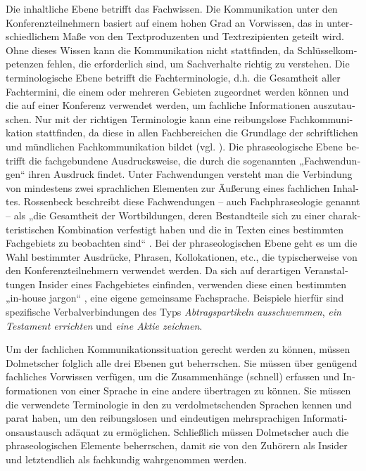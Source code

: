 \documentclass[output=paper]{LSP/langsci}
\begin{document}
\begin{otherlanguage}{ngerman}
Die inhaltliche Ebene betrifft das Fachwissen. Die Kommunikation unter den Konferenzteilnehmern basiert auf einem hohen Grad an Vorwissen, das in unterschiedlichem Maße von den Textproduzenten und Textrezipienten geteilt wird. Ohne dieses Wissen kann die Kommunikation nicht stattfinden, da Schlüsselkompetenzen fehlen, die erforderlich sind, um Sachverhalte richtig zu verstehen. Die terminologische Ebene betrifft die Fachterminologie, d.h. die Gesamtheit aller Fachtermini, die einem oder mehreren Gebieten zugeordnet werden können und die auf einer Konferenz verwendet werden, um fachliche Informationen auszutauschen. Nur mit der richtigen Terminologie kann eine reibungslose Fachkommunikation stattfinden, da diese in allen Fachbereichen die Grundlage der schriftlichen und mündlichen Fachkommunikation bildet (vgl. \citealt[6]{Arntz2009}). Die phraseologische Ebene betrifft die fachgebundene Ausdrucksweise, die durch die sogenannten „Fachwendungen“ \citep[207]{Picht1990} ihren Ausdruck findet. Unter Fachwendungen versteht man die Verbindung von mindestens zwei sprachlichen Elementen zur Äußerung eines fachlichen Inhaltes. Rossenbeck beschreibt diese Fachwendungen -- auch Fachphraseologie genannt -- als „die Gesamtheit der Wortbildungen, deren Bestandteile sich zu einer charakteristischen Kombination verfestigt haben und die in Texten eines bestimmten Fachgebiets zu beobachten sind“ \citep[199]{Rossenbeck1989}. Bei der phraseologischen Ebene geht es um die Wahl bestimmter Ausdrücke, Phrasen, Kollokationen, etc., die typischerweise von den Konferenzteilnehmern verwendet werden. Da sich auf derartigen Veranstaltungen Insider eines Fachgebietes einfinden, verwenden diese einen bestimmten „in-house jargon“ \citep[777]{Kalina2005}, eine eigene gemeinsame Fachsprache. Beispiele hierfür sind spezifische Verbalverbindungen des Typs \textit{Abtragspartikeln ausschwemmen}, \textit{ein Testament errichten} und \textit{eine Aktie zeichnen}. 

Um der fachlichen Kommunikationssituation gerecht werden zu können, müssen Dolmetscher folglich alle drei Ebenen gut beherrschen. Sie müssen über genügend fachliches Vorwissen verfügen, um die Zusammenhänge (schnell) erfassen und Informationen von einer Sprache in eine andere übertragen zu können. Sie müssen die verwendete Terminologie in den zu verdolmetschenden Sprachen kennen und parat haben, um den reibungslosen und eindeutigen mehrsprachigen Informationsaustausch adäquat zu ermöglichen. Schließlich müssen Dolmetscher auch die phraseologischen Elemente beherrschen, damit sie von den Zuhörern als Insider und letztendlich als fachkundig wahrgenommen werden.


\end{otherlanguage}
\end{document}
